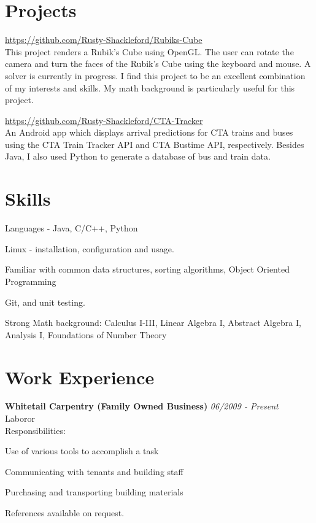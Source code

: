 \documentclass[letterpaper]{article}
\begin{document}
\section*{Projects}
\begin{compactitem}
    \item \url{https://github.com/Rusty-Shackleford/Rubiks-Cube} \\
    This project renders a Rubik's Cube using OpenGL. The user can rotate the 
    camera and turn the faces of the Rubik's Cube using the keyboard and mouse. 
    A solver is currently in progress. I find this project to be an excellent 
    combination of my interests and skills. My math background is particularly 
    useful for this project.
    \vspace{1ex}

    \item \url{https://github.com/Rusty-Shackleford/CTA-Tracker} \\
    An Android app which displays arrival predictions for CTA trains and buses 
    using the CTA Train Tracker API and CTA Bustime API, respectively. Besides 
    Java, I also used Python to generate a database of bus and train data.
\end{compactitem}


\section*{Skills}
\begin{compactitem}
    \item Languages - Java, C/C++, Python
    \item Linux - installation, configuration and usage.
    \item Familiar with common data structures, sorting algorithms, Object Oriented Programming
    \item Git, and unit testing.
    \item Strong Math background: Calculus I-III, Linear Algebra I, Abstract Algebra I, Analysis I, Foundations of Number Theory
\end{compactitem}




\section*{Work Experience}
\textbf{Whitetail Carpentry (Family Owned Business)} \hfill \emph{06/2009 - Present} \\
Laboror \\
Responsibilities:
\vspace{-1ex}
\begin{compactitem}
    \item Use of various tools to accomplish a task
    \item Communicating with tenants and building staff
    \item Purchasing and transporting building materials
\end{compactitem}

References available on request. 
\end{document}
